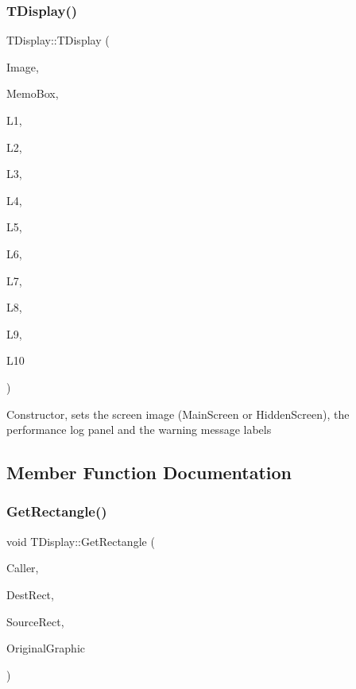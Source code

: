 \subsubsection{\texorpdfstring{T\+Display()}{TDisplay()}}
{\footnotesize\ttfamily T\+Display\+::\+T\+Display (\begin{DoxyParamCaption}\item[{T\+Image $\ast$\&}]{Image,  }\item[{T\+Memo $\ast$\&}]{Memo\+Box,  }\item[{T\+Label $\ast$\&}]{L1,  }\item[{T\+Label $\ast$\&}]{L2,  }\item[{T\+Label $\ast$\&}]{L3,  }\item[{T\+Label $\ast$\&}]{L4,  }\item[{T\+Label $\ast$\&}]{L5,  }\item[{T\+Label $\ast$\&}]{L6,  }\item[{T\+Label $\ast$\&}]{L7,  }\item[{T\+Label $\ast$\&}]{L8,  }\item[{T\+Label $\ast$\&}]{L9,  }\item[{T\+Label $\ast$\&}]{L10 }\end{DoxyParamCaption})}

Constructor, sets the screen image (Main\+Screen or Hidden\+Screen), the performance log panel and the warning message labels 

\subsection{Member Function Documentation}
\mbox{\label{class_t_display_a2b408bc588565f7b0cdcb85edc7479b7}} 
\subsubsection{\texorpdfstring{Get\+Rectangle()}{GetRectangle()}}
{\footnotesize\ttfamily void T\+Display\+::\+Get\+Rectangle (\begin{DoxyParamCaption}\item[{int}]{Caller,  }\item[{T\+Rect}]{Dest\+Rect,  }\item[{T\+Rect}]{Source\+Rect,  }\item[{Graphics\+::\+T\+Bitmap $\ast$\&}]{Original\+Graphic }\end{DoxyParamCaption})}

